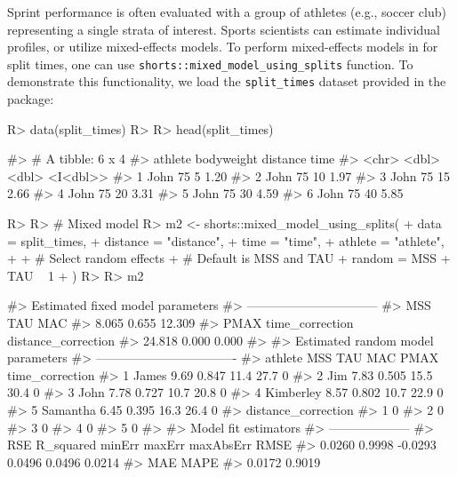 \documentclass[
]{jss}
\begin{document}
Sprint performance is often evaluated with a group of athletes (e.g., soccer club) representing a single strata of interest. Sports scientists can estimate individual profiles, or utilize mixed-effects models. To perform mixed-effects models in  for split times, one can use \texttt{shorts::mixed\_model\_using\_splits} function. To demonstrate this functionality, we load the \texttt{split\_times} dataset provided in the  package:

\begin{CodeChunk}
\begin{CodeInput}
R> data(split_times)
R> 
R> head(split_times)
\end{CodeInput}
\begin{CodeOutput}
#> # A tibble: 6 x 4
#>   athlete bodyweight distance     time
#>   <chr>        <dbl>    <dbl> <I<dbl>>
#> 1 John            75        5     1.20
#> 2 John            75       10     1.97
#> 3 John            75       15     2.66
#> 4 John            75       20     3.31
#> 5 John            75       30     4.59
#> 6 John            75       40     5.85
\end{CodeOutput}
\begin{CodeInput}
R> 
R> # Mixed model
R> m2 <- shorts::mixed_model_using_splits(
+   data = split_times,
+   distance = "distance",
+   time = "time",
+   athlete = "athlete",
+ 
+   # Select random effects
+   # Default is MSS and TAU
+   random = MSS + TAU ~ 1
+ )
R> 
R> m2
\end{CodeInput}
\begin{CodeOutput}
#> Estimated fixed model parameters
#> --------------------------------
#>                 MSS                 TAU                 MAC 
#>               8.065               0.655              12.309 
#>                PMAX     time_correction distance_correction 
#>              24.818               0.000               0.000 
#> 
#> Estimated random model parameters
#> ----------------------------------
#>     athlete  MSS   TAU  MAC PMAX time_correction
#> 1     James 9.69 0.847 11.4 27.7               0
#> 2       Jim 7.83 0.505 15.5 30.4               0
#> 3      John 7.78 0.727 10.7 20.8               0
#> 4 Kimberley 8.57 0.802 10.7 22.9               0
#> 5  Samantha 6.45 0.395 16.3 26.4               0
#>   distance_correction
#> 1                   0
#> 2                   0
#> 3                   0
#> 4                   0
#> 5                   0
#> 
#> Model fit estimators
#> --------------------
#>       RSE R_squared    minErr    maxErr maxAbsErr      RMSE 
#>    0.0260    0.9998   -0.0293    0.0496    0.0496    0.0214 
#>       MAE      MAPE 
#>    0.0172    0.9019
\end{CodeOutput}
\end{CodeChunk}
\end{document}
